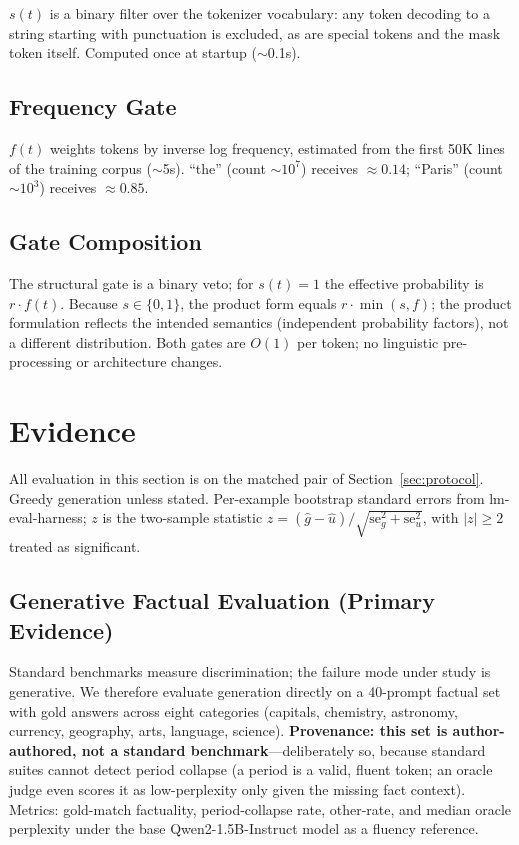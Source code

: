 \documentclass{article}
\begin{document}
$s(t)$ is a binary filter over the tokenizer vocabulary: any token decoding to a
string starting with punctuation is excluded, as are special tokens and the mask token
itself. Computed once at startup ($\sim$0.1s).

\subsection{Frequency Gate}

$f(t)$ weights tokens by inverse log frequency, estimated from the first 50K lines of
the training corpus ($\sim$5s). ``the'' (count $\sim 10^7$) receives $\approx 0.14$;
``Paris'' (count $\sim 10^3$) receives $\approx 0.85$.

\subsection{Gate Composition}

The structural gate is a binary veto; for $s(t)=1$ the effective probability is
$r \cdot f(t)$. Because $s \in \{0,1\}$, the product form equals $r \cdot
\min(s,f)$; the product formulation reflects the intended semantics (independent
probability factors), not a different distribution. Both gates are $O(1)$ per token;
no linguistic pre-processing or architecture changes.


\section{Evidence}
\label{sec:experiments}

All evaluation in this section is on the matched pair of Section~\ref{sec:protocol}.
Greedy generation unless stated. Per-example bootstrap standard errors from
lm-eval-harness; $z$ is the two-sample statistic
$z = (\hat{g} - \hat{u}) / \sqrt{\mathrm{se}_g^2 + \mathrm{se}_u^2}$, with
$|z| \ge 2$ treated as significant.

\subsection{Generative Factual Evaluation (Primary Evidence)}
\label{sec:generative}

Standard benchmarks measure discrimination; the failure mode under study is
generative. We therefore evaluate generation directly on a 40-prompt factual set with
gold answers across eight categories (capitals, chemistry, astronomy, currency,
geography, arts, language, science). \textbf{Provenance: this set is author-authored,
not a standard benchmark}---deliberately so, because standard suites cannot detect
period collapse (a period is a valid, fluent token; an oracle judge even scores it as
low-perplexity only given the missing fact context). Metrics: gold-match factuality,
period-collapse rate, other-rate, and median oracle perplexity under the base
Qwen2-1.5B-Instruct model as a fluency reference.
\end{document}
